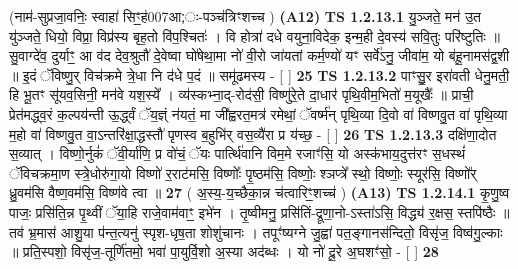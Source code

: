 \documentclass[17pt]{extarticle}
\begin{document}
                  \newline
                      (नाम॑-सुप्रजा॒वनिः॒ स्वाहा॑ सिꣳ॒॒ह॑007आ;ः-पञ्च॑त्रिꣳशच्च )  \textbf{(A12)} \newline \newline
                                        \textbf{ TS 1.2.13.1} \newline
                  यु॒ञ्जते॒ मन॑ उ॒त यु॑ञ्जते॒ धियो॒ विप्रा॒ विप्र॑स्य बृह॒तो वि॑प॒श्चितः॑ । वि होत्रा॑ दधे वयुना॒विदेक॒ इन्म॒ही दे॒वस्य॑ सवि॒तुः परि॑ष्टुतिः ॥ सु॒वाग्दे॑व॒ दुर्याꣳ॒॒ आ व॑द देव॒श्रुतौ॑ दे॒वेष्वा घो॑षेथा॒मा नो॑ वी॒रो जा॑यतां कर्म॒ण्यो॑ यꣳ सर्वे॑ऽनु॒ जीवा॑म॒ यो ब॑हू॒नामस॑द्व॒शी ॥ इ॒दं ॅविष्णु॒र् विच॑क्रमे त्रे॒धा नि द॑धे प॒दं ॥ समू॑ढमस्य - [ ] \textbf{  25} \newline
                  \newline
                                \textbf{ TS 1.2.13.2} \newline
                  पाꣳसु॒॒र इरा॑वती धेनु॒मती॒ हि भू॒तꣳ सू॑यव॒सिनी॒ मन॑वे यश॒स्ये᳚ । व्य॑स्कभ्ना॒द्-रोद॑सी॒ विष्णु॑रे॒ते दा॒धार॑ पृथि॒वीम॒भितो॑ म॒यूखैः᳚ ॥ प्राची॒ प्रेत॑मद्ध्व॒रं क॒ल्पय॑न्ती ऊ॒र्द्ध्वं ॅय॒ज्ञ्ं न॑यतं॒ मा जी᳚ह्वरत॒मत्र॑ रमेथां॒ ॅवर्ष्म॑न् पृथि॒व्या दि॒वो वा॑ विष्णवु॒त वा॑ पृथि॒व्या म॒हो वा॑ विष्णवु॒त वा॒ऽन्तरि॑क्षा॒द्धस्तौ॑ पृणस्व ब॒हुभि॑र् वस॒व्यै॑रा प्र य॑च्छ॒ - [ ] \textbf{  26} \newline
                  \newline
                                \textbf{ TS 1.2.13.3} \newline
                  दक्षि॑णा॒दोत स॒व्यात् । विष्णो॒र्नुकं॑ ॅवी॒र्या॑णि॒ प्र वो॑चं॒ ॅयः पार्त्थि॑वानि विम॒मे रजाꣳ॑सि॒ यो अस्क॑भाय॒दुत्त॑रꣳ स॒धस्थं॑ ॅविचक्रमा॒ण स्त्रे॒धोरु॑गा॒यो विष्णो॑ र॒राट॑मसि॒ विष्णोः᳚ पृ॒ष्ठम॑सि॒ विष्णोः॒ श्ञप्त्रे᳚ स्थो॒ विष्णोः॒ स्यूर॑सि॒ विष्णो᳚र् ध्रु॒वम॑सि वैष्ण॒वम॑सि॒ विष्ण॑वे त्वा ॥ \textbf{  27} \newline
                  \newline
                      ( अ॒स्य॒-य॒च्छैका॒न्न च॑त्वारिꣳ॒॒शच्च॑ )  \textbf{(A13)} \newline \newline
                                        \textbf{ TS 1.2.14.1} \newline
                  कृ॒णु॒ष्व पाजः॒ प्रसि॑ति॒न्न पृ॒थ्वीं ॅया॒हि राजे॒वाम॑वाꣳ॒॒ इभे॑न । तृ॒ष्वीमनु॒ प्रसि॑तिं-द्रूणा॒नो-ऽस्ता॑ऽसि॒ विद्ध्य॑ र॒क्षस॒ स्तपि॑ष्ठैः ॥ तव॑ भ्र॒मास॑ आशु॒या प॑न्त॒त्यनु॑ स्पृश-धृष॒ता शोशु॑चानः । तपूꣳ॑ष्यग्ने जु॒ह्वा॑ पत॒ङ्गानस॑न्दितो॒ विसृ॑ज॒ विष्व॑गु॒ल्काः ॥ प्रति॒स्पशो॒ विसृ॑ज॒-तूर्णि॑तमो॒ भवा॑ पा॒युर्वि॒शो अ॒स्या अद॑ब्धः । यो नो॑ दू॒रे अ॒घशꣳ॑सो॒ - [ ] \textbf{  28} \newline
\end{document}
